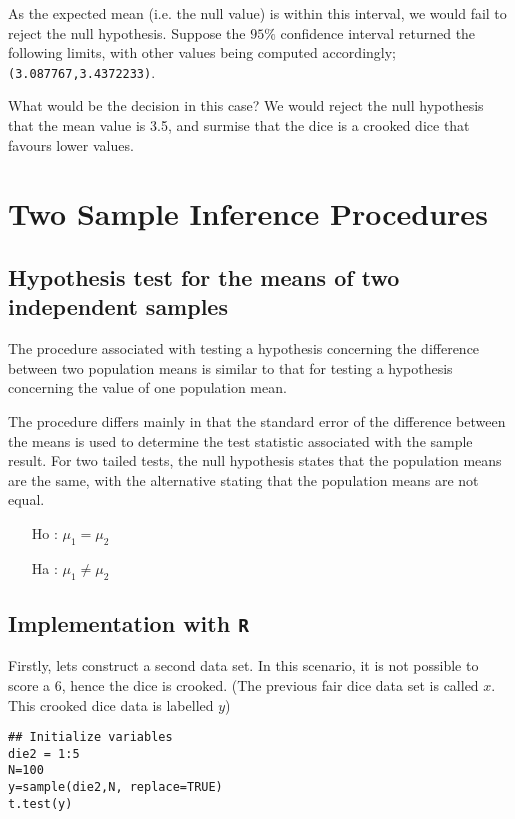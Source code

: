 As the expected mean (i.e. the null value) is within this interval, we would fail to reject the null hypothesis.
Suppose the $95\%$ confidence interval returned the following limits, with other values being computed accordingly; \texttt{(3.087767,3.4372233)}.

What would be the decision in this case? We would reject the null hypothesis that the mean value is 3.5, and surmise that the dice is a crooked dice that favours lower values.


\newpage
\section{Two Sample Inference Procedures}
\subsection{Hypothesis test for the means of two independent samples}
The procedure associated with testing a hypothesis concerning the difference between two population means is similar to that for testing a hypothesis concerning the value of one population mean.

The procedure differs mainly in that the standard error of the difference between the means is used to determine the test statistic associated with the sample result. For two tailed tests, the null hypothesis states that the population means are the same, with the alternative stating that the population means are not equal.

       \begin{itemize}
       \item[Ho] : $\mu_1 = \mu_2$
       \item[Ha] : $\mu_1 \neq \mu_2$
       \end{itemize}

\subsection{Implementation with \texttt{R}}
Firstly, lets construct a second data set. In this scenario, it is not possible to score a 6, hence the dice is crooked.
(The previous fair dice data set is called $x$. This crooked dice data is labelled $y$)
\begin{framed}
\begin{verbatim}
## Initialize variables
die2 = 1:5
N=100
y=sample(die2,N, replace=TRUE)
t.test(y)
\end{verbatim}
\end{framed}

